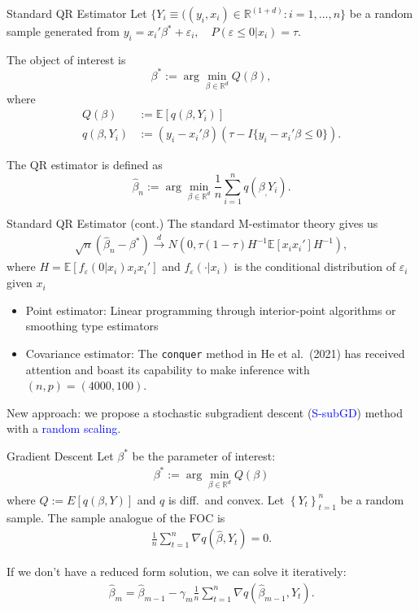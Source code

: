\documentclass[beamer, t]{beamer}
\newcommand{\eqs}[1]{\begin{align*}#1\end{align*}}
\newcommand{\bit}{\begin{itemize}}
\newcommand{\eit}{\end{itemize}}
\newcommand{\tcb}{\textcolor{blue}}
\begin{document}
\begin{frame}{Standard QR Estimator}
	Let $\{Y_i\equiv((y_i,x_i) \in \mathbb{R}^(1+d): i=1,\ldots,n\}$ be a random sample generated from 
		$y_i = x_i'\beta^*+ \varepsilon_i,\quad P(\varepsilon\leq 0|x_i)= \tau.$
	\bigskip 

	The object of interest is
	$$
		\beta^* := \arg\min_{\beta \in \mathbb{R}^d} Q(\beta),
	$$
	where 
	\begin{align*}
	Q(\beta) & := \mathbb{E}[q(\beta,Y_i)]\\
	q(\beta, Y_i) &:=(y_i-x_i'\beta)(\tau-I\{y_i -x_i'\beta \le0\}).
	\end{align*}

	The QR estimator is defined as
	$$
		\widehat{\beta}_n := \arg\min_{\beta \in \mathbb{R}^d} \frac{1}{n} \sum_{i=1}^{n} q(\beta_,Y_i).
	$$
\end{frame}

\begin{frame}{Standard QR Estimator (cont.)}
	The standard M-estimator theory gives us 
	\eqs{
	\sqrt{n}(\widehat\beta_n-\beta^*) \overset{d}{\to} N(0, \tau(1-\tau)H^{-1}\mathbb E[x_ix_i'] H^{-1}),
	}
	where $H= \mathbb E [f_{\varepsilon}(0|x_i)x_ix_i']$ and $f_{\varepsilon}(\cdot|x_i)$ is the conditional distribution of $\varepsilon_i$ given $x_i$

	\bit
		\item Point estimator: Linear programming through interior-point algorithms or smoothing type estimators
		\item Covariance estimator: 
		The \texttt{conquer} method in He et al.~(2021) has received attention and boast its capability to make inference with $ (n,p)=(4000,100) $.
	\eit
	New approach: we propose a stochastic subgradient descent (\tcb{S-subGD}) method with a \tcb{random scaling}.
\end{frame}




\begin{frame}{Gradient Descent}
Let $\beta^*$ be the parameter of interest:
\eqs{
    \beta^{*}:=\arg\min_{\beta\in\mathbb{R}^{d}}Q\left(\beta\right)
}
where $Q:=E[q(\beta,Y)]$ and $q$ is diff.~and convex. Let $\left\{ Y_{t}\right\} _{t=1}^{n}$ be a random sample. The sample analogue of the FOC is
\eqs{
    \frac{1}{n}\sum_{t=1}^n \nabla q\left(\hat{\beta},Y_{t}\right) = 0.
}

If we don't have a reduced form solution, we can solve it iteratively:
\eqs{
    \hat{\beta}_{m} = \hat{\beta}_{m-1} - \gamma_m \frac{1}{n}\sum_{t=1}^n \nabla q\left(\hat{\beta}_{m-1},Y_{t}\right).
}
\end{frame}
\end{document}
